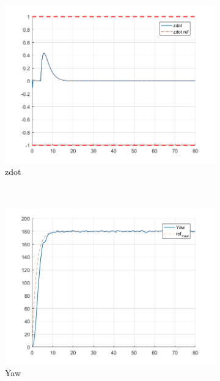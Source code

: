 \documentclass[11pt]{article}
\begin{document}
\begin{enumerate}
\begin{figure}[ht]
        \begin{subfigure}[c]{0.3\linewidth}
            \centering
            \includegraphics[width=\linewidth]{Plots_11_NonlinearModel_StepSignal/04}
            \caption{zdot}
        \end{subfigure}
        ~
        \begin{subfigure}[c]{0.3\linewidth}
            \centering
            \includegraphics[width=\linewidth]{Plots_11_NonlinearModel_StepSignal/05}
            \caption{Yaw}
        \end{subfigure}
        ~
        \begin{subfigure}[c]{0.3\linewidth}
            \centering

\end{subfigure}
\end{figure}
\end{enumerate}
\end{document}
